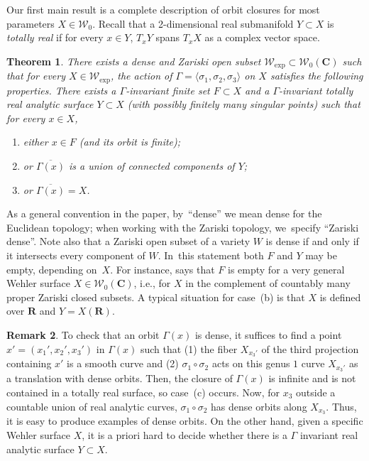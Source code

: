 \documentclass[11pt]{article}
\newcommand{\ie}{i.e.,\xspace}
\newenvironment{enumeratea}
{\bgroup\def\theenumi{\alph{enumi}}\begin{enumerate}}
{\end{enumerate}\egroup}
\def\C{\mathbf{C}}
\def\R{\mathbf{R}}
\newcommand{\cW}{\mathcal{W}}
\theoremstyle{plain}
\newtheorem{thm}{Theorem}[section]
\theoremstyle{definition}
\newtheorem{rem}[thm]{Remark}
\numberwithin{equation}{section}
\begin{document}
Our first main result is a complete description of orbit closures for
most parameters $X\in \cW_0$.
Recall that a 2-dimensional real submanifold
$Y\subset X$ is \emph{totally real} if for every $x\in Y$, $T_xY$ spans $T_xX$ as a
complex vector space.

\begin{thm}\label{thm:orbits_wehler}
There exists a dense and Zariski open subset
$ \cW_{\mathrm{exp}}\subset \cW_0(\C)$
such that for every $X\in \cW_{\mathrm{exp}}$, the action of $\Gamma=\langle \sigma_1, \sigma_2, \sigma_3\rangle$ on $X$ satisfies the following properties. There exists
a $\Gamma$-invariant finite set $F\subset X$ and
a $\Gamma$-invariant totally real analytic surface $Y\subset X$ (with possibly finitely many singular points)
such that for {\rm{every}} $x\in X$,
\begin{enumeratea}
\item\label{thm:orbits_wehlera} either $x\in F$ (and its orbit is finite);
\item or $\overline{\Gamma(x)}$ is a union of connected components of $Y$;
\item\label{thm:orbits_wehlerb} or $\overline{\Gamma(x)} = X$.
\end{enumeratea}
\end{thm}

As a general convention in the paper, by~``dense'' we mean dense for the Euclidean topology; when working with the Zariski topology, we~specify ``Zariski dense''. Note also that a Zariski open subset of a variety
$W$ is dense if and only if it intersects every component of $W$. In~this statement both $F$ and $Y$ may be empty, depending on~$X$.
For instance, \cite[Th.\,A]{finite_orbits} says that $F$ is empty for a very general Wehler surface $X\in \cW_0(\C)$,
\ie for $X$ in the complement of countably many proper Zariski closed subsets. A typical situation for
case~(b) is that $X$ is defined over $\R$ and $Y=X(\R)$.

\begin{rem}
To check that an orbit $\Gamma(x)$ is dense, it suffices to find a point $x'=(x_1',x_2',x_3')$ in $\Gamma(x)$ such that (1) the fiber $X_{x_3'}$ of the third projection containing $x'$ is a smooth curve and (2) $\sigma_1\circ\sigma_2$ acts on this genus $1$ curve $X_{x_3'}$ as a translation with dense orbits. Then, the closure of $\Gamma(x)$ is infinite and is not contained in a totally real surface, so case~(c) occurs.
Now, for $x_3$ outside a countable union of real analytic curves, $\sigma_1\circ\sigma_2$ has dense orbits along $X_{x_3}$. Thus, it is easy to produce examples of dense orbits.
On the other hand, given a specific Wehler surface $X$, it is a priori hard to decide whether there is a $\Gamma$ invariant real analytic surface $Y\subset X$.
\end{rem}
\end{document}
